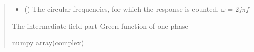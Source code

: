 \documentclass[letterpaper,10pt,english]{sphinxmanual}
\begin{document}
\begin{fulllineitems}
\begin{quote}
\begin{description}
\begin{itemize}
\item {} 
\sphinxAtStartPar
{} (\sphinxstyleliteralemphasis{\sphinxupquote{(}}\sphinxstyleliteralemphasis{\sphinxupquote{)}}) \textendash{} The circular frequencies, for which the response is counted. \(\omega = 2j\pi f\)

\end{itemize}

\sphinxAtStartPar
The intermediate field part Green function of one phase

\sphinxAtStartPar
numpy array(complex)

\end{description}\end{quote}

\end{fulllineitems}

\end{document}
